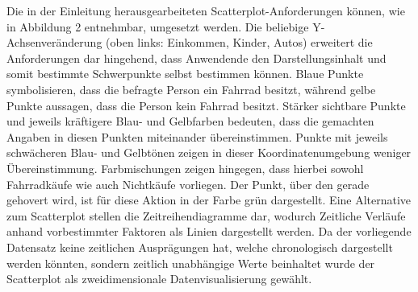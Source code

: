 \documentclass[usegeometry=true]{scrartcl}
\begin{document}
\newline Die in der Einleitung herausgearbeiteten Scatterplot-Anforderungen können, wie in Abbildung 2 entnehmbar, umgesetzt werden. Die beliebige Y-Achsenveränderung (oben links: Einkommen, Kinder, Autos) erweitert die Anforderungen dar hingehend, dass Anwendende den Darstellungsinhalt und somit bestimmte Schwerpunkte selbst bestimmen können. Blaue Punkte symbolisieren, dass die befragte Person ein Fahrrad besitzt, während gelbe Punkte aussagen, dass die Person kein Fahrrad besitzt. Stärker sichtbare Punkte und jeweils kräftigere Blau- und Gelbfarben bedeuten, dass die gemachten Angaben in diesen Punkten miteinander übereinstimmen. Punkte mit jeweils schwächeren Blau- und Gelbtönen zeigen in dieser Koordinatenumgebung weniger Übereinstimmung. Farbmischungen zeigen hingegen, dass hierbei sowohl Fahrradkäufe wie auch Nichtkäufe vorliegen. Der Punkt, über den gerade gehovert wird, ist für diese Aktion in der Farbe grün dargestellt. 
Eine Alternative zum Scatterplot stellen die Zeitreihendiagramme dar, wodurch Zeitliche Verläufe anhand vorbestimmter Faktoren als Linien dargestellt werden. Da der vorliegende Datensatz keine zeitlichen Ausprägungen hat, welche chronologisch dargestellt werden könnten, sondern zeitlich unabhängige Werte beinhaltet wurde der Scatterplot als zweidimensionale Datenvisualisierung gewählt.
\end{document}
